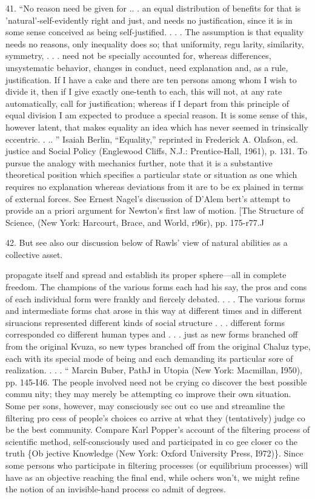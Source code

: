 \documentclass[11pt,openany]{book}
\begin{document}
{41. ``No reason need be given for .. . an equal distribution of benefits for that is 'natural'-self-evidently right and just, and needs no justification, since it is in some sense conceived as being self-justified. . . . The assumption is that equality needs no reasons, only inequality does so; that uniformity, regu larity, similarity, symmetry, . . . need not be specially accounted for, whereas differences, unsystematic behavior, changes in conduct, need explanation and, as a rule, justification. If I have a cake and there are ten persons among whom I wish to divide it, then if I give exactly one-tenth to each, this will not, at any rate automatically, call for justification; whereas if I depart from this principle of equal division I am expected to produce a special reason. It is some sense of this, however latent, that makes equality an idea which has never seemed in trinsically eccentric. . .. '' Isaiah Berlin, ``Equality,'' reprinted in Frederick A. Olafson, ed. justice and Social Policy (Englewood Cliffs, N.J.: Prentice-Hall, 1961), p. 131. To pursue the analogy with mechanics further, note that it is a substantive theoretical position which specifies a particular state or situation as one which requires no explanation whereas deviations from it are to be ex plained in terms of external forces. See Ernest Nagel's discussion of D'Alem bert's attempt to provide an a priori argument for Newton's first law of motion. [The Structure of Science, (New York: Harcourt, Brace, and World, r96r), pp. 175-r77.J\par

42. But see also our discussion below of Rawls' view of natural abilities as a collective asset.\par

propagate itself and spread and establish its proper sphere---all in complete freedom. The champions of the various forms each had his say, the pros and cons of each individual form were frankly and fiercely debated. . . . The various forms and intermediate forms chat arose in this way at different times and in different siruacions represented different kinds of social structure . . . different forms corresponded co different human types and . . . just as new forms branched off from the original Kvuza, so new types branched off from the original Chaluz type, each with its special mode of being and each demanding its particular sore of realization. . . . `` Marcin Buber, PathJ in Utopia (New York: Macmillan, I950), pp. 145-I46. The people involved need not be crying co discover the best possible commu nity; they may merely be attempting co improve their own situation. Some per sons, however, may consciously sec out co use and streamline the filtering pro cess of people's choices co arrive at what they (tentatively) judge co be the best community. Compare Karl Popper's account of the filtering process of scientific method, self-consciously used and participated in co gee closer co the truth \{Ob jective Knowledge (New York: Oxford University Press, I972)\}. Since some persons who participate in filtering processes (or equilibrium processes) will have as an objective reaching the final end, while ochers won't, we might refine the notion of an invisible-hand process co admit of degrees.\par

}
\end{document}
